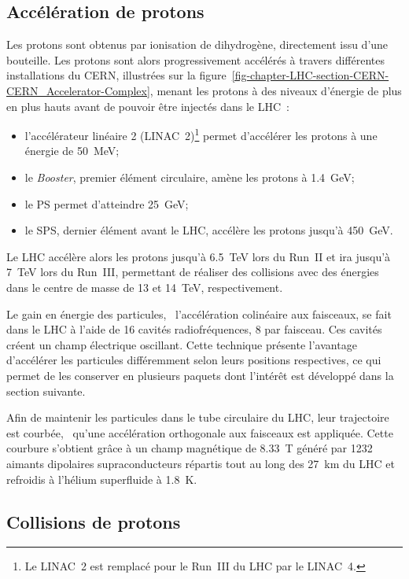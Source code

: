 \subsection{Accélération de protons}\label{chapter-LHC-section-LHC-subsec-pp_acceleration}
Les protons sont obtenus par ionisation de dihydrogène, directement issu d'une bouteille.
Les protons sont alors progressivement accélérés à travers différentes installations du CERN, illustrées sur la figure~\ref{fig-chapter-LHC-section-CERN-CERN_Accelerator-Complex}, menant les protons à des niveaux d'énergie de plus en plus hauts avant de pouvoir être injectés dans le LHC~\cite{LHC_paper3}:
\begin{itemize}
\item l'accélérateur linéaire 2 (LINAC~2)\footnote{Le LINAC~2 est remplacé pour le Run~III du LHC par le LINAC~4.} permet d'accélérer les protons à une énergie de \SI{50}{\MeV};
\item le \emph{Booster}, premier élément circulaire, amène les protons à \SI{1.4}{\GeV};
\item le PS permet d'atteindre \SI{25}{\GeV};
\item le SPS, dernier élément avant le LHC, accélère les protons jusqu'à \SI{450}{\GeV}.
\end{itemize}
Le LHC accélère alors les protons jusqu'à \SI{6.5}{\TeV} lors du Run~II et ira jusqu'à \SI{7}{\TeV} lors du Run~III, permettant de réaliser des collisions avec des énergies dans le centre de masse de \num{13} et \SI{14}{\TeV}, respectivement.
\par Le gain en énergie des particules, \ie\ l'accélération colinéaire aux faisceaux, se fait dans le LHC à l'aide de 16 cavités radiofréquences, 8 par faisceau.
Ces cavités créent un champ électrique oscillant.
Cette technique présente l'avantage d'accélérer les particules différemment selon leurs positions respectives, ce qui permet de les conserver en plusieurs paquets dont l'intérêt est développé dans la section suivante.
\par Afin de maintenir les particules dans le tube circulaire du LHC, leur trajectoire est courbée, \ie\ qu'une accélération orthogonale aux faisceaux est appliquée.
Cette courbure s'obtient grâce à un champ magnétique de \SI{8.33}{\tesla} généré par 1232 aimants dipolaires supraconducteurs répartis tout au long des \SI{27}{\kilo\meter} du LHC et refroidis à l'hélium superfluide à \SI{1.8}{\kelvin}.
\subsection{Collisions de protons}\label{chapter-LHC-section-LHC-subsec-pp_collisions}
